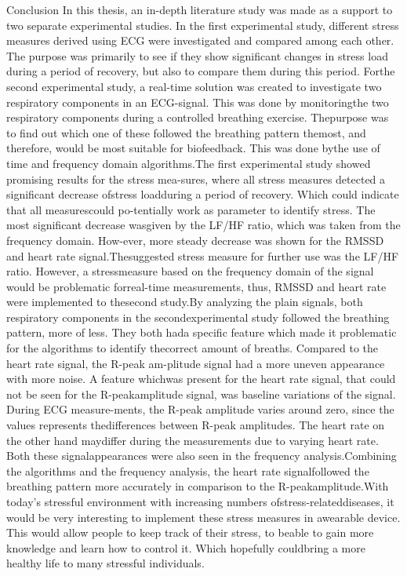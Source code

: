 Conclusion
In this thesis, an in-depth literature study was made as a support to two separate experimental studies. In the first experimental study, different stress measures derived using ECG were investigated and compared among each other.  The purpose was primarily to see if they show significant changes in stress load during a period of recovery, but also to compare them during this period. Forthe second experimental study, a real-time solution was created to investigate two respiratory components in an ECG-signal. This was done by monitoringthe two respiratory components during a controlled breathing exercise.  Thepurpose was to find out which one of these followed the breathing pattern themost, and therefore, would be most suitable for biofeedback. This was done bythe use of time and frequency domain algorithms.The first experimental study showed promising results for the stress mea-sures, where all stress measures detected a significant decrease ofstress loadduring a period of recovery. Which could indicate that all measurescould po-tentially work as parameter to identify stress. The most significant decrease wasgiven by the LF/HF ratio, which was taken from the frequency domain. How-ever, more steady decrease was shown for the RMSSD and heart rate signal.Thesuggested stress measure for further use was the LF/HF ratio. However, a stressmeasure based on the frequency domain of the signal would be problematic forreal-time measurements, thus, RMSSD and heart rate were implemented to thesecond study.By analyzing the plain signals, both respiratory components in the secondexperimental study followed the breathing pattern, more of less. They both hada specific feature which made it problematic for the algorithms to identify thecorrect amount of breaths. Compared to the heart rate signal, the R-peak am-plitude signal had a more uneven appearance with more noise. A feature whichwas present for the heart rate signal, that could not be seen for the R-peakamplitude signal, was baseline variations of the signal. During ECG measure-ments, the R-peak amplitude varies around zero, since the values represents thedifferences between R-peak amplitudes. The heart rate on the other hand maydiffer during the measurements due to varying heart rate. Both these signalappearances were also seen in the frequency analysis.Combining the algorithms and the frequency analysis, the heart rate signalfollowed the breathing pattern more accurately in comparison to the R-peakamplitude.With today’s stressful environment with increasing numbers ofstress-relateddiseases, it would be very interesting to implement these stress measures in awearable device. This would allow people to keep track of their stress, to beable to gain more knowledge and learn how to control it. Which hopefully couldbring a more healthy life to many stressful individuals.
